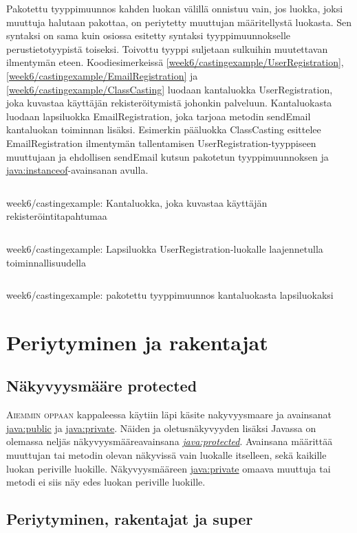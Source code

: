 \documentclass[openany]{book}
\newcommand{\newthought}[1]{\smallskip\textsc{#1}}
\newcommand{\java}[1]{\underline{\gls{java:#1}}}
\newcommand{\newjava}[1]{\textit{\java{#1}}}
\newcommand{\code}[3]{
	\begin{listing}
		\linespread{0.85}
		\inputminted{java}{OhjelmointiopasEsimerkit/src/#1/#2.java}
		\caption{#1: #3}
		\label{#1/#2}
	\end{listing}
}
\begin{document}
Pakotettu tyyppimuunnos kahden luokan välillä onnistuu vain, jos luokka, joksi muuttuja
halutaan pakottaa, on periytetty muuttujan määritellystä luokasta. Sen syntaksi on sama kuin
osiossa  esitetty syntaksi tyyppimuunnokselle perustietotyypistä toiseksi.
Toivottu tyyppi suljetaan sulkuihin muutettavan ilmentymän eteen. Koodiesimerkeissä
\ref{week6/castingexample/UserRegistration}, \ref{week6/castingexample/EmailRegistration} ja
\ref{week6/castingexample/ClassCasting} luodaan \gls{kantaluokka} UserRegistration, joka kuvastaa
käyttäjän rekisteröitymistä johonkin palveluun. Kantaluokasta luodaan \gls{lapsiluokka}
EmailRegistration, joka tarjoaa metodin sendEmail kantaluokan toiminnan lisäksi. Esimerkin
pääluokka ClassCasting esittelee EmailRegistration ilmentymän tallentamisen
UserRegistration-tyyppiseen muuttujaan ja ehdollisen sendEmail kutsun pakotetun tyyppimuunnoksen
ja \java{instanceof}-avainsanan avulla. 

\code{week6/castingexample}{UserRegistration}{Kantaluokka, joka kuvastaa käyttäjän
rekisteröintitapahtumaa}
\code{week6/castingexample}{EmailRegistration}{Lapsiluokka UserRegistration-luokalle laajennetulla
toiminnallisuudella}
\code{week6/castingexample}{ClassCasting}{\Gls{pakotettu tyyppimuunnos} kantaluokasta lapsiluokaksi}

\section{Periytyminen ja rakentajat}
\label{superprotected}

\subsection{Näkyvyysmääre protected}
\label{protected}

\newthought{Aiemmin oppaan} kappaleessa  käytiin läpi käsite
\gls{nakyvyysmaare} ja avainsanat \java{public} ja \java{private}. Näiden ja oletusnäkyvyyden
lisäksi Javassa on olemassa neljäs näkyvyysmääreavainsana \newjava{protected}. Avainsana määrittää
muuttujan tai metodin olevan näkyvissä vain luokalle itselleen, sekä kaikille luokan periville
luokille. Näkyvyysmääreen \java{private} omaava muuttuja tai metodi ei siis näy edes luokan
periville luokille.

\subsection{Periytyminen, rakentajat ja super}
\label{super}
\end{document}

